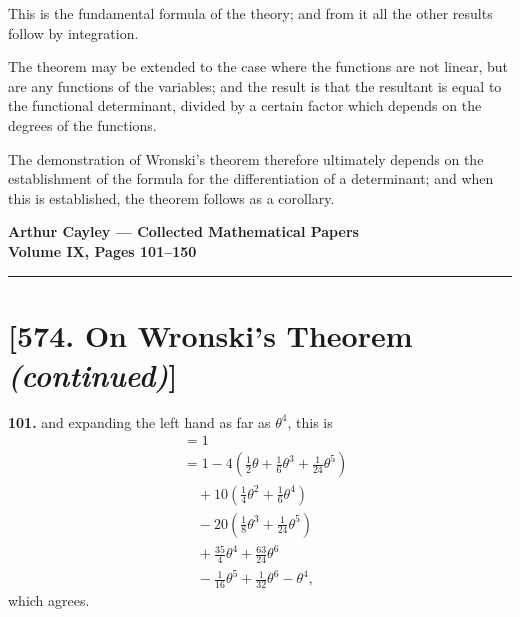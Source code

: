 \documentclass[11pt,a4paper]{book}
\begin{document}
This is the fundamental formula of the theory; and from it all the other results follow by integration.

\newpage

The theorem may be extended to the case where the functions are not linear, but are any functions of the variables; and the result is that the resultant is equal to the functional determinant, divided by a certain factor which depends on the degrees of the functions.

The demonstration of Wronski's theorem therefore ultimately depends on the establishment of the formula for the differentiation of a determinant; and when this is established, the theorem follows as a corollary.
\clearpage


\begin{center}
\Large\bfseries Arthur Cayley --- Collected Mathematical Papers\\[4pt]
\large Volume IX, Pages 101--150
\end{center}

\vspace{1em}
\hrule
\vspace{1.5em}

\section*{[574. On Wronski's Theorem \textit{(continued)}]}

\noindent\textbf{101.} and expanding the left hand as far as $\theta^4$, this is
\begin{align*}
&= 1 \\
&= 1 - 4(\tfrac{1}{2}\theta + \tfrac{1}{6}\theta^3 + \tfrac{1}{24}\theta^5) \\
&\quad {}+ 10(\tfrac{1}{4}\theta^2 + \tfrac{1}{6}\theta^4) \\
&\quad {}- 20(\tfrac{1}{8}\theta^3 + \tfrac{1}{24}\theta^5) \\
&\quad {}+ \tfrac{35}{4}\theta^4 + \tfrac{63}{24}\theta^6 \\
&\quad {}- \tfrac{1}{16}\theta^5 + \tfrac{1}{32}\theta^6 - \theta^4,
\end{align*}
which agrees.
\end{document}
